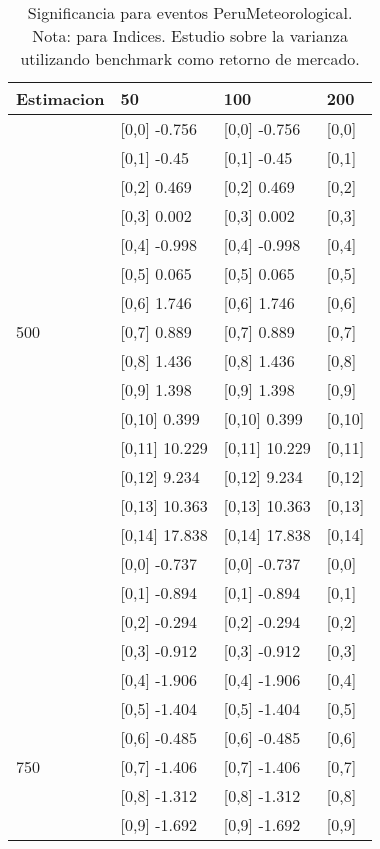 \begin{table}

\caption{Significancia para eventos PeruMeteorological. Nota: para Indices. Estudio sobre la varianza utilizando benchmark como retorno de mercado.}
\centering
\begin{tabular}[t]{llll}
\toprule
Estimacion & 50 & 100 & 200\\
\midrule
 & {}[0,0] -0.756 & {}[0,0] -0.756 & {}[0,0]\\
 & {}[0,1] -0.45 & {}[0,1] -0.45 & {}[0,1]\\
 & {}[0,2] 0.469 & {}[0,2] 0.469 & {}[0,2]\\
 & {}[0,3] 0.002 & {}[0,3] 0.002 & {}[0,3]\\
 & {}[0,4] -0.998 & {}[0,4] -0.998 & {}[0,4]\\
\addlinespace
 & {}[0,5] 0.065 & {}[0,5] 0.065 & {}[0,5]\\
 & {}[0,6] 1.746 & {}[0,6] 1.746 & {}[0,6]\\
500 & {}[0,7] 0.889 & {}[0,7] 0.889 & {}[0,7]\\
 & {}[0,8] 1.436 & {}[0,8] 1.436 & {}[0,8]\\
 & {}[0,9] 1.398 & {}[0,9] 1.398 & {}[0,9]\\
\addlinespace
 & {}[0,10] 0.399 & {}[0,10] 0.399 & {}[0,10]\\
 & {}[0,11] 10.229 & {}[0,11] 10.229 & {}[0,11]\\
 & {}[0,12] 9.234 & {}[0,12] 9.234 & {}[0,12]\\
 & {}[0,13] 10.363 & {}[0,13] 10.363 & {}[0,13]\\
 & {}[0,14] 17.838 & {}[0,14] 17.838 & {}[0,14]\\
\addlinespace
 & {}[0,0] -0.737 & {}[0,0] -0.737 & {}[0,0]\\
 & {}[0,1] -0.894 & {}[0,1] -0.894 & {}[0,1]\\
 & {}[0,2] -0.294 & {}[0,2] -0.294 & {}[0,2]\\
 & {}[0,3] -0.912 & {}[0,3] -0.912 & {}[0,3]\\
 & {}[0,4] -1.906 & {}[0,4] -1.906 & {}[0,4]\\
\addlinespace
 & {}[0,5] -1.404 & {}[0,5] -1.404 & {}[0,5]\\
 & {}[0,6] -0.485 & {}[0,6] -0.485 & {}[0,6]\\
750 & {}[0,7] -1.406 & {}[0,7] -1.406 & {}[0,7]\\
 & {}[0,8] -1.312 & {}[0,8] -1.312 & {}[0,8]\\
 & {}[0,9] -1.692 & {}[0,9] -1.692 & {}[0,9]\\

\end{tabular}
\end{table}
